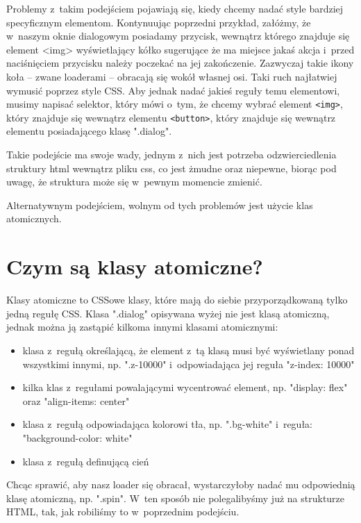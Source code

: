 \documentclass{SGGW-thesis}
\begin{document}
Problemy z~takim podejściem pojawiają się, kiedy chcemy nadać style bardziej specyficznym elementom. Kontynuując poprzedni przykład, załóżmy, że w~naszym oknie dialogowym posiadamy przycisk, wewnątrz którego znajduje się element <img> wyświetlający kółko sugerujące że ma miejsce jakaś akcja i~przed naciśnięciem przycisku należy poczekać na jej zakończenie. Zazwyczaj takie ikony koła -- zwane loaderami -- obracają się wokół własnej osi. Taki ruch najłatwiej wymusić poprzez style CSS. Aby jednak nadać jakieś reguły temu elementowi, musimy napisać selektor, który mówi o~tym, że chcemy wybrać element \verb|<img>|, który znajduje się wewnątrz elementu \verb|<button>|, który znajduje się wewnątrz elementu posiadającego klasę ".dialog".

Takie podejście ma swoje wady, jednym z~nich jest potrzeba odzwierciedlenia struktury html wewnątrz pliku css, co jest żmudne oraz niepewne, biorąc pod uwagę, że struktura może się w~pewnym momencie zmienić.

Alternatywnym podejściem, wolnym od tych problemów jest użycie klas atomicznych\cite{css_master}.


\section{Czym są klasy atomiczne?}
Klasy atomiczne to CSSowe klasy, które mają do siebie przyporządkowaną tylko jedną regułę CSS. Klasa ".dialog" opisywana wyżej nie jest klasą atomiczną, jednak można ją zastąpić kilkoma innymi klasami atomicznymi:
\begin{itemize}
    \item klasa z~regułą określającą, że element z~tą klasą musi być wyświetlany ponad wszystkimi innymi, np. ".z-10000" i~odpowiadająca jej reguła "z-index: 10000"
    \item kilka klas z~regułami powalającymi wycentrować element, np. "display: flex" oraz "align-items: center"
    \item klasa z~regułą odpowiadająca kolorowi tła, np. ".bg-white" i~reguła: "background-color: white"
    \item klasa z~regułą definującą cień
\end{itemize}

Chcąc sprawić, aby nasz loader się obracał, wystarczyłoby nadać mu odpowiednią klasę atomiczną, np. ".spin". W~ten sposób nie polegalibyśmy już na strukturze HTML, tak, jak robiliśmy to w~poprzednim podejściu.
\end{document}
